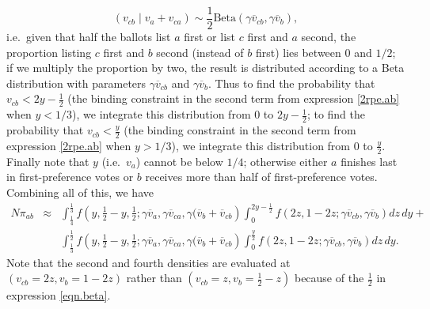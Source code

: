 \documentclass[11pt,a4paper]{article}
\begin{document}
\begin{equation}
\left(v_{cb}  \mid v_{a} + v_{ca} \right)  \sim \frac{1}{2} \mathrm{Beta}\left(\gamma \overline{v}_{cb}, \gamma \overline{v}_b\right),  \label{eqn.beta}
\end{equation}
i.e.\ given that half the ballots list $a$ first or list $c$ first and $a$ second, the proportion listing $c$ first and $b$ second (instead of $b$ first) lies between 0 and $1/2$; if we multiply the proportion by two, the result is distributed according to a Beta distribution with parameters $\gamma \overline{v}_{cb}$  and $\gamma \overline{v}_b$. Thus to find the probability that $v_{cb} < 2y - \frac{1}{2}$ (the binding constraint in the second term from expression \ref{2rpe.ab} when $y  < 1/3$), we integrate this distribution from 0 to $2y - \frac{1}{2}$; to find the probability that $v_{cb} < \frac{y}{2}$ (the binding constraint in the second term from expression \ref{2rpe.ab} when $y  > 1/3$), we integrate this distribution from 0 to $\frac{y}{2}$. Finally note that $y$ (i.e.\ $v_a$) cannot be below $1/4$; otherwise either $a$ finishes last in first-preference votes or $b$ receives more than half of first-preference votes. Combining all of this, we have    
\begin{eqnarray} 
 N \pi_{ab} &\approx&  \int_{\frac{1}{4}}^{\frac{1}{3}} f\left(y, \frac{1}{2} - y, \frac{1}{2}; \gamma \overline{v}_a, \gamma \overline{v}_{ca}, \gamma (\overline{v}_b + \overline{v}_{cb} \right) \int_0^{2y - \frac{1}{2}} f \left(2 z, 1 - 2z; \gamma \overline{v}_{cb}, \gamma \overline{v}_b \right) dz \, dy + \nonumber \\  
 &&   \int_{\frac{1}{3}}^{\frac{1}{2}} f\left(y, \frac{1}{2} - y, \frac{1}{2}; \gamma \overline{v}_a, \gamma \overline{v}_{ca}, \gamma (\overline{v}_b + \overline{v}_{cb} \right) \int_0^{\frac{y}{2}} f \left(2z, 1 - 2z; \gamma \overline{v}_{cb}, \gamma \overline{v}_b \right) dz \, dy.   \label{second.round.pivotal.dir.no.trunc}
\end{eqnarray} 
Note that the second and fourth densities are evaluated at $(v_{cb} = 2z, v_b = 1-2z)$ rather than $(v_{cb} = z, v_b = \frac{1}{2} - z)$ because 
of the $\frac{1}{2}$ in expression \ref{eqn.beta}. 
\end{document}
